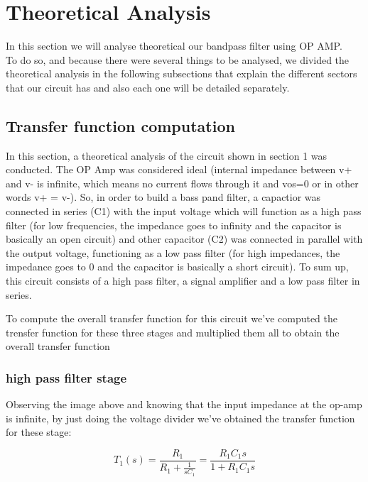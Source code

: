 \section{Theoretical Analysis}
\label{sec:analysis}

In this section we will analyse theoretical our bandpass filter using OP AMP. \\
To do so, and because there were several things to be analysed, we divided the theoretical analysis in the following subsections that explain the different sectors that our circuit has and also each one will be detailed separately.\\

\subsection{Transfer function computation}

In this section, a theoretical analysis of the circuit shown in section 1 was conducted. The OP Amp was considered ideal (internal impedance between v+ and v- is infinite, which means no current flows through it and vos=0 or in other words v+ = v-). So, in order to build a bass pand filter, a capactior was connected in series (C1) with the input voltage which will function as a high pass filter (for low frequencies, the impedance goes to infinity and the capacitor is basically an open circuit)  and other capacitor (C2) was connected in parallel with the output voltage, functioning as a low pass filter (for high impedances, the impedance goes to 0 and the capacitor is basically a short circuit). To sum up, this circuit consists of a high pass filter, a signal amplifier and a low pass filter in series.

To compute the overall transfer function for this circuit we've computed the trensfer function for these three stages and multiplied them all to obtain the overall transfer function

\subsubsection{high pass filter stage}

Observing the image above and knowing that the input impedance at the op-amp is infinite, by just doing the voltage divider we've obtained the transfer function for these stage:

\begin{equation}
T_1(s) = \frac{R_1}{R_1 + \frac{1}{sC_1}} = \frac{R_1C_1s}{1+R_1C_1s}
\end{equation}   

